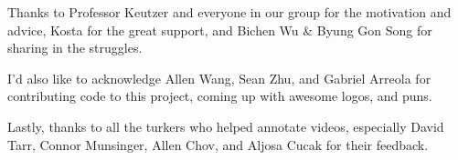 Thanks to Professor Keutzer and everyone in our group for the motivation and advice, Kosta for the great support, and Bichen Wu \& Byung Gon Song for sharing in the struggles.

I'd also like to acknowledge Allen Wang, Sean Zhu, and Gabriel Arreola for contributing code to this project, coming up with awesome logos, and puns.

Lastly, thanks to all the turkers who helped annotate videos, especially David Tarr, Connor Munsinger, Allen Chov, and Aljosa Cucak for their feedback.
